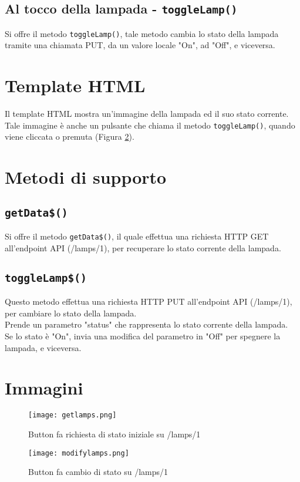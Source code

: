 \subsection{Al tocco della lampada - \texttt{toggleLamp()}}

Si offre il metodo \texttt{toggleLamp()}, tale metodo cambia lo stato della lampada tramite una chiamata PUT, da un valore locale "On", ad "Off", e viceversa.

\section{Template HTML}
Il template HTML mostra un'immagine della lampada ed il suo stato corrente. \\
Tale immagine è anche un pulsante che chiama il metodo \texttt{toggleLamp()}, quando viene cliccata o premuta (Figura \ref{fig:modifylamps}).

\section{Metodi di supporto}

\subsection{\texttt{getData\$()}}
Si offre il metodo \texttt{getData\$()}, il quale effettua una richiesta HTTP GET all'endpoint API (/lamps/1), per recuperare lo stato corrente della lampada.

\subsection{\texttt{toggleLamp\$()}}
Questo metodo effettua una richiesta HTTP PUT all'endpoint API (/lamps/1), per cambiare lo stato della lampada. \\
Prende un parametro "status" che rappresenta lo stato corrente della lampada. \\
Se lo stato è "On", invia una modifica del parametro in "Off" per spegnere la lampada, e viceversa.

\section{Immagini}

\begin{figure}[H]
    \centering
    \texttt{[image: getlamps.png]}
    \caption{Button fa richiesta di stato iniziale su /lamps/1}
    \label{fig:getlamps}
\end{figure}


\begin{figure}[H]
    \centering
    \texttt{[image: modifylamps.png]}
    \caption{Button fa cambio di stato su /lamps/1}
    \label{fig:modifylamps}
\end{figure}
